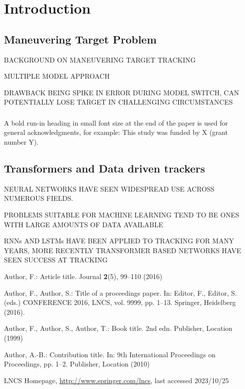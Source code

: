 \documentclass[runningheads]{llncs}
\begin{document}
\section{Introduction}
\subsection{Maneuvering Target Problem}

BACKGROUND ON MANEUVERING TARGET TRACKING

MULTIPLE MODEL APPROACH

DRAWBACK BEING SPIKE IN ERROR DURING MODEL SWITCH, CAN POTENTIALLY LOSE TARGET IN CHALLENGING CIRCUMSTANCES


\subsubsection{\ackname} A bold run-in heading in small font size at the end of the paper is
used for general acknowledgments, for example: This study was funded
by X (grant number Y).

\subsubsection{\discintname}

\subsection{Transformers and Data driven trackers}

NEURAL NETWORKS HAVE SEEN WIDESPREAD USE ACROSS NUMEROUS FIELDS.

PROBLEMS SUITABLE FOR MACHINE LEARNING TEND TO BE ONES WITH LARGE AMOUNTS OF DATA AVAILABLE

RNNs AND LSTMs HAVE BEEN APPLIED TO TRACKING FOR MANY YEARS, MORE RECENTLY TRANSFORMER BASED NETWORKS HAVE SEEN SUCCESS AT TRACKING




%
%
%
% 
% 
%
\begin{thebibliography}{8}
Author, F.: Article title. Journal \textbf{2}(5), 99--110 (2016)

Author, F., Author, S.: Title of a proceedings paper. In: Editor,
F., Editor, S. (eds.) CONFERENCE 2016, LNCS, vol. 9999, pp. 1--13.
Springer, Heidelberg (2016). 

Author, F., Author, S., Author, T.: Book title. 2nd edn. Publisher,
Location (1999)

Author, A.-B.: Contribution title. In: 9th International Proceedings
on Proceedings, pp. 1--2. Publisher, Location (2010)

LNCS Homepage, \url{http://www.springer.com/lncs}, last accessed 2023/10/25
\end{thebibliography}
\end{document}
